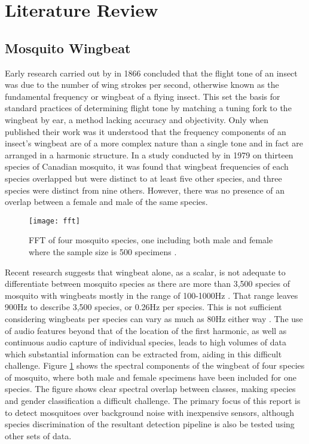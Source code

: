\section{Literature Review}
\label{sec:bg-litreview}

    \subsection{Mosquito Wingbeat}
    \label{subsec:bg-litreview-mozz}
        
        Early research carried out by \textcite{Landois1866} in 1866 concluded that the flight tone of an insect was due to the number of wing strokes per second, otherwise known as the fundamental frequency or wingbeat of a flying insect. This set the basis for standard practices of determining flight tone by matching a tuning fork to the wingbeat by ear, a method lacking accuracy and objectivity. Only when \textcite{Williams1950} published their work was it understood that the frequency components of an insect's wingbeat are of a more complex nature than a single tone and in fact are arranged in a harmonic structure. In a study conducted by \textcite{Belton1979} in 1979 on thirteen species of Canadian mosquito, it was found that wingbeat frequencies of each species overlapped but were distinct to at least five other species, and three species were distinct from nine others. However, there was no presence of an overlap between a female and male of the same species. 
        \begin{figure}[ht]
            \centering
            \texttt{[image: fft]}
            \caption{FFT of four mosquito species, one including both male and female where the sample size is 500 specimens \cite{Chen2014}.}
            \label{fig:bg-litreview-mozz-fft}
        \end{figure}
        Recent research suggests that wingbeat alone, as a scalar, is not adequate to differentiate between mosquito species as there are more than 3,500 species of mosquito with wingbeats mostly in the range of 100-1000Hz \cite{Chen2014}. That range leaves 900Hz to describe 3,500 species, or 0.26Hz per species. This is not sufficient considering wingbeats per species can vary as much as 80Hz either way \cite{Arthur2014}. The use of audio features beyond that of the location of the first harmonic, as well as continuous audio capture of individual species, leads to high volumes of data which substantial information can be extracted from, aiding in this difficult challenge. Figure \ref{fig:bg-litreview-mozz-fft} shows the spectral components of the wingbeat of four species of mosquito, where both male and female specimens have been included for one species. The figure shows clear spectral overlap between classes, making species and gender classification a difficult challenge. The primary focus of this report is to detect mosquitoes over background noise with inexpensive sensors, although species discrimination of the resultant detection pipeline is also be tested using other sets of data.
